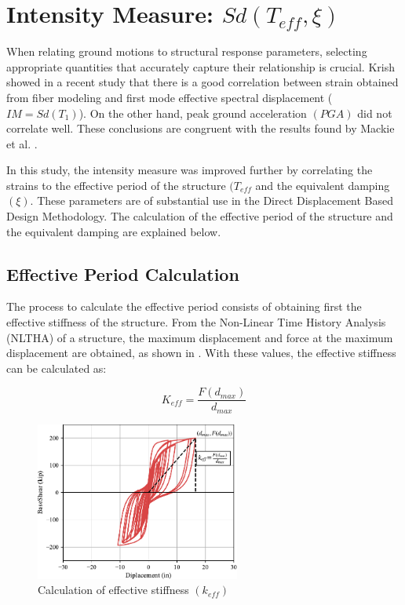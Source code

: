 \section{Intensity Measure: $Sd(T_{eff},\xi)$}

When relating ground motions to structural response parameters, selecting appropriate quantities that accurately capture their relationship is crucial. Krish \cite{Krish2018} showed in a recent study that there is a good correlation between strain obtained from fiber modeling and first mode effective spectral displacement ($IM=Sd(T_1)$). On the other hand, peak ground acceleration $(PGA)$ did not correlate well. These conclusions are congruent with the results found by Mackie et al. \cite{Mackie2003}. 

In this study, the intensity measure was improved further by correlating the strains to the effective period of the structure $(T_{eff}$ and the equivalent damping $(\xi)$. These parameters are of substantial use in the Direct Displacement Based Design Methodology. The calculation of the effective period of the structure and the equivalent damping are explained below.

\subsection{Effective Period Calculation}

The process to  calculate the effective period consists of obtaining first the effective stiffness of the structure. From the Non-Linear Time History Analysis (NLTHA) of a structure, the maximum displacement and force at the maximum displacement are obtained, as shown in . With these values, the effective stiffness can be calculated as:

\begin{equation}
     K_{eff}=\frac{F(d_{max})}{d_{max}}
    \label{eq:Keff_calcualtion}
\end{equation}

\begin{figure}[htbp]
	\centering
	\includegraphics[width=0.60\textwidth]{VAC Thesis 2.0/Chapter-5/figs/Force_Diplacement_Keff_Calc.pdf}
	\caption{Calculation of effective stiffness $(k_{eff})$}
	\label{fig:k_eff_calculation}
\end{figure}

